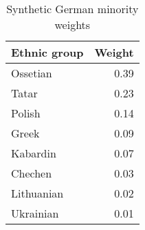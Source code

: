 \begin{table}[t]

\caption{\label{tab:sc_weights}Synthetic German minority weights}
\centering
\begin{tabular}{lr}
\toprule
Ethnic group & Weight\\
\midrule
Ossetian & 0.39\\
Tatar & 0.23\\
Polish & 0.14\\
Greek & 0.09\\
Kabardin & 0.07\\
Chechen & 0.03\\
Lithuanian & 0.02\\
Ukrainian & 0.01\\
\bottomrule
\end{tabular}
\end{table}